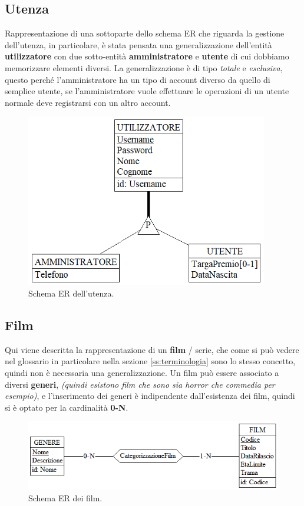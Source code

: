 \documentclass[a4paper,12pt]{report}
\begin{document}
	\subsection{Utenza}
	Rappresentazione di una sottoparte dello schema ER che riguarda la gestione dell'utenza, in particolare, è stata pensata una generalizzazione dell'entità \textbf{utilizzatore} con due sotto-entità \textbf{amministratore} e \textbf{utente} di cui dobbiamo memorizzare elementi diversi. La generalizzazione è di tipo \textit{totale} e \textit{esclusiva}, questo perché l'amministratore ha un tipo di account diverso da quello di semplice utente, se l'amministratore vuole effettuare le operazioni di un utente normale deve registrarsi con un altro account.
	\begin{figure}[H]
		\centering
		\includegraphics[width=300pt]{ER/utenza.png}
		\caption{Schema ER dell'utenza.}
	\end{figure}
	\subsection{Film}
	Qui viene descritta la rappresentazione di un \textbf{film} / serie, che come si può vedere nel glossario in particolare nella sezione \ref{ss:terminologia} sono lo stesso concetto, quindi non è necessaria una generalizzazione. Un film può essere associato a diversi \textbf{generi}, \textit{(quindi esistono film che sono sia horror che commedia per esempio)}, e l'inserimento dei generi è indipendente dall'esistenza dei film, quindi si è optato per la cardinalità \textbf{0-N}.
	\begin{figure}[H]
		\centering
		\includegraphics[width=450pt]{ER/film.png}
		\caption{Schema ER dei film.}
	\end{figure}
\end{document}
